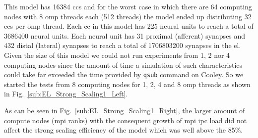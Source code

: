 \documentclass[10pt,journal,compsoc]{IEEEtran}
\begin{document}
This model has 16384 \glspl{cc} and for the worst case in which there are 64 computing nodes with 8 \gls{omp} threads each (512 threads) the model ended up distributing 32 \glspl{cc} per \gls{omp} thread. Each \gls{cc} in this model has 225 neural units to reach a total of 3686400 neural units. Each neural unit has 31 proximal (afferent) synapses and 432 distal (lateral) synapses to reach a total of 1706803200 synapses in the \gls{el}. Given the size of this model we could not run experiments from 1, 2 nor 4 computing nodes since the amount of time a simulation of such characteristics could take far exceeded the time provided by \texttt{qsub} command on Cooley. So we started the tests from 8 computing nodes for 1, 2, 4 and 8 \gls{omp} threads as shown in Fig.~\ref{sub:EL_Strong_Scaling1_Left}.





As can be seen in Fig.~\ref{sub:EL_Strong_Scaling1_Right}, the larger amount of compute nodes (\gls{mpi} ranks) with the consequent growth of \gls{mpi} \gls{ipc} load did not affect the strong scaling efficiency of the model which was well above the 85\%.
\end{document}
